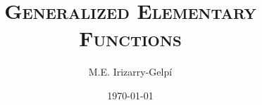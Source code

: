 \documentclass[letterpaper, 12pt]{report}
\begin{document}
\title{\textsc{Generalized Elementary Functions}}
\author{M.E. Irizarry-Gelp\'{i}}
\date{\today}
\maketitle
\tableofcontents









\end{document}
